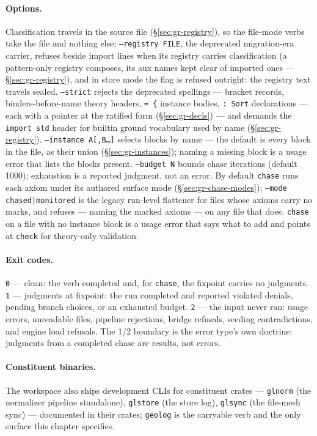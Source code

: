 \paragraph{Options.} Classification travels in the source file
(\S\ref{sec:gr-registry}), so the file-mode verbs take the file and
nothing else; \texttt{--registry FILE}, the deprecated migration-era
carrier, refuses beside import lines when its registry carries
classification (a pattern-only registry composes, its aux names
kept clear of imported ones — \S\ref{sec:gr-registry}), and in
store mode the flag is refused outright: the registry text travels
sealed.
\texttt{--strict} rejects the deprecated spellings — bracket
records, binders-before-name theory headers, \texttt{=~\{} instance
bodies, \texttt{:~Sort} declarations — each with a pointer at the
ratified form (\S\ref{sec:gr-decls}) — and demands the
\texttt{import std} header for builtin ground vocabulary used by
name (\S\ref{sec:gr-registry}). \texttt{--instance A[,B…]}
selects blocks by name — the default is every block in the file, as
their union (\S\ref{sec:gr-instances}); naming a missing block is a
usage error that lists the blocks present. \texttt{--budget N} bounds
chase iterations (default 1000); exhaustion is a reported judgment,
not an error. By default \texttt{chase} runs each axiom under its
authored surface mode (\S\ref{sec:gr-chase-modes});
\texttt{--mode chased|monitored} is the legacy run-level flattener
for files whose axioms carry no marks, and refuses — naming the
marked axioms — on any file that does. \texttt{chase} on a file with
no instance block is a usage error that says what to add and points
at \texttt{check} for theory-only validation.

\paragraph{Exit codes.} \texttt{0} — clean: the verb completed and,
for \texttt{chase}, the fixpoint carries no judgments. \texttt{1} —
judgments at fixpoint: the run completed and reported violated
denials, pending branch choices, or an exhausted budget. \texttt{2} —
the input never ran: usage errors, unreadable files, pipeline
rejections, bridge refusals, seeding contradictions, and engine load
refusals. The 1/2 boundary is the error type's own doctrine:
judgments from a completed chase are results, not errors.

\paragraph{Constituent binaries.} The workspace also ships
development CLIs for constituent crates — \texttt{glnorm} (the
normalizer pipeline standalone), \texttt{glstore} (the store log),
\texttt{glsync} (the file-mesh sync) — documented in their crates;
\texttt{geolog} is the carryable verb and the only surface this
chapter specifies.

